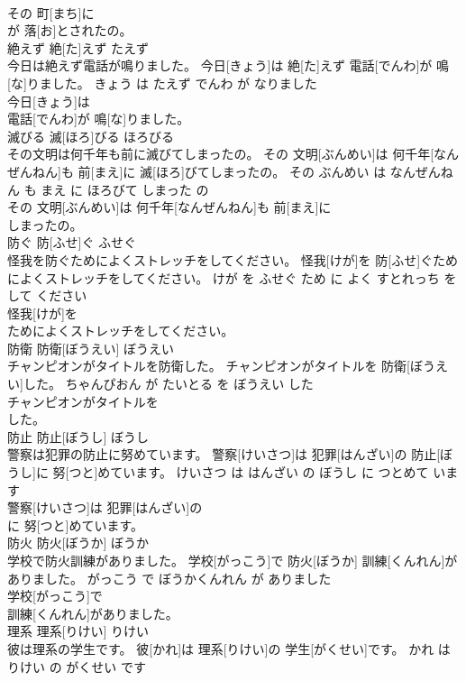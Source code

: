 \documentclass[8pt]{extreport}
\begin{document}
\begin{CJK}{UTF8}{min}
\\	その 町[まち]に
\\	が 落[お]とされたの。			
\\	絶えず	絶[た]えず	たえず	
\\	今日は絶えず電話が鳴りました。	今日[きょう]は 絶[た]えず 電話[でんわ]が 鳴[な]りました。	きょう は たえず でんわ が なりました	
\\	今日[きょう]は
\\	電話[でんわ]が 鳴[な]りました。			
\\	滅びる	滅[ほろ]びる	ほろびる	
\\	その文明は何千年も前に滅びてしまったの。	その 文明[ぶんめい]は 何千年[なんぜんねん]も 前[まえ]に 滅[ほろ]びてしまったの。	その ぶんめい は なんぜんねん も まえ に ほろびて しまった の	
\\	その 文明[ぶんめい]は 何千年[なんぜんねん]も 前[まえ]に
\\	しまったの。			
\\	防ぐ	防[ふせ]ぐ	ふせぐ	
\\	怪我を防ぐためによくストレッチをしてください。	怪我[けが]を 防[ふせ]ぐためによくストレッチをしてください。	けが を ふせぐ ため に よく すとれっち を して ください	
\\	怪我[けが]を
\\	ためによくストレッチをしてください。			
\\	防衛	防衛[ぼうえい]	ぼうえい	
\\	チャンピオンがタイトルを防衛した。	チャンピオンがタイトルを 防衛[ぼうえい]した。	ちゃんぴおん が たいとる を ぼうえい した	
\\	チャンピオンがタイトルを
\\	した。			
\\	防止	防止[ぼうし]	ぼうし	
\\	警察は犯罪の防止に努めています。	警察[けいさつ]は 犯罪[はんざい]の 防止[ぼうし]に 努[つと]めています。	けいさつ は はんざい の ぼうし に つとめて います	
\\	警察[けいさつ]は 犯罪[はんざい]の
\\	に 努[つと]めています。			
\\	防火	防火[ぼうか]	ぼうか	
\\	学校で防火訓練がありました。	学校[がっこう]で 防火[ぼうか] 訓練[くんれん]がありました。	がっこう で ぼうかくんれん が ありました	
\\	学校[がっこう]で
\\	訓練[くんれん]がありました。			
\\	理系	理系[りけい]	りけい	
\\	彼は理系の学生です。	彼[かれ]は 理系[りけい]の 学生[がくせい]です。	かれ は りけい の がくせい です	

\end{CJK}
\end{document}

